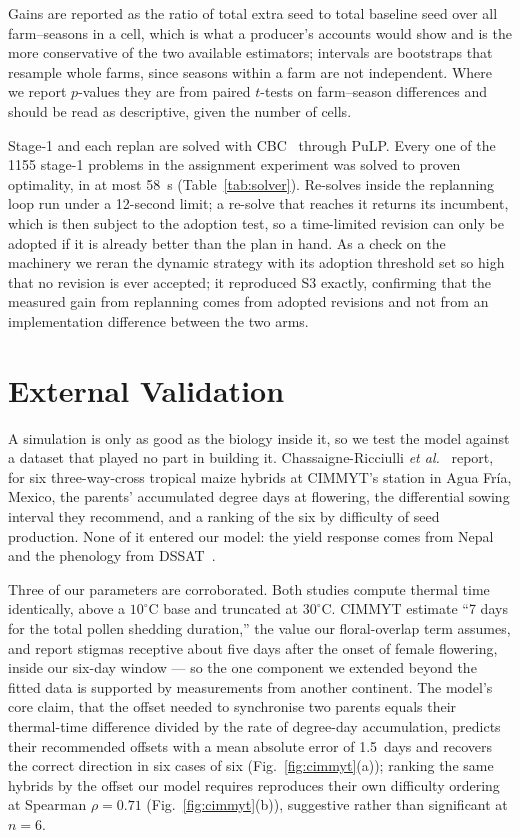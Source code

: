 \documentclass[10pt,twocolumn]{article}
\begin{document}
Gains are reported as the ratio of total extra seed to total baseline seed
over all farm--seasons in a cell, which is what a producer's accounts would
show and is the more conservative of the two available estimators;
intervals are bootstraps that resample whole farms, since seasons within a
farm are not independent. Where we report $p$-values they are from paired
$t$-tests on farm--season differences and should be read as descriptive,
given the number of cells.

Stage-1 and each replan are solved with CBC~\cite{cbc}
through PuLP. Every one of the 1155 stage-1 problems in the assignment experiment was solved to proven optimality, in at most 58~s (Table~\ref{tab:solver}). Re-solves inside the replanning loop run under a 12-second limit; a re-solve that reaches it returns its incumbent, which is then subject to the adoption test, so a time-limited revision can only be adopted if it is already better than the plan in hand. As a check on the machinery we reran the
dynamic strategy with its adoption threshold set so high that no revision
is ever accepted; it reproduced S3 exactly, confirming that the measured
gain from replanning comes from adopted revisions and not from an
implementation difference between the two arms.

\section{External Validation}
\label{sec:validation}

A simulation is only as good as the biology inside it, so we test the model
against a dataset that played no part in building it.
Chassaigne-Ricciulli \textit{et al.}~\cite{chassaigne2021} report, for six
three-way-cross tropical maize hybrids at CIMMYT's station in Agua Fr\'ia,
Mexico, the parents' accumulated degree days at flowering, the differential
sowing interval they recommend, and a ranking of the six by difficulty of
seed production. None of it entered our model: the yield response comes from
Nepal~\cite{marahatta2025} and the phenology from DSSAT~\cite{dssat}.

Three of our parameters are corroborated. Both studies compute thermal time
identically, above a $10^\circ$C base and truncated at $30^\circ$C. CIMMYT
estimate ``7 days for the total pollen shedding duration,'' the value our
floral-overlap term assumes, and report stigmas receptive about five days
after the onset of female flowering, inside our six-day window --- so the one
component we extended beyond the fitted data is supported by measurements
from another continent. The model's core claim, that the offset needed to
synchronise two parents equals their thermal-time difference divided by the
rate of degree-day accumulation, predicts their recommended offsets with a
mean absolute error of 1.5~days and recovers the correct direction in six
cases of six (Fig.~\ref{fig:cimmyt}(a)); ranking the same hybrids by the
offset our model requires reproduces their own difficulty ordering at
Spearman $\rho = 0.71$ (Fig.~\ref{fig:cimmyt}(b)), suggestive rather than
significant at $n = 6$.
\end{document}
